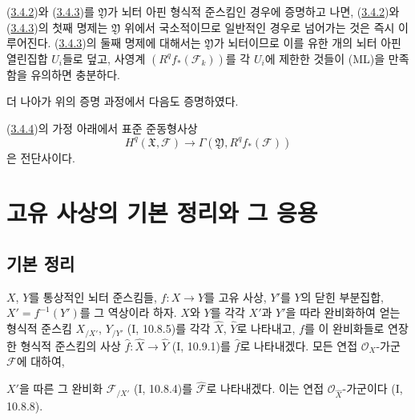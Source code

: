 \begin{env}[3.4.5]
(\hyperref[III.3.4.2-fr]{3.4.2})와
(\hyperref[III.3.4.3-fr]{3.4.3})를 $\mathfrak Y$가 뇌터 아핀
형식적 준스킴인 경우에 증명하고 나면,
(\hyperref[III.3.4.2-fr]{3.4.2})와
(\hyperref[III.3.4.3-fr]{3.4.3})의 첫째 명제는 $\mathfrak Y$ 위에서
국소적이므로 일반적인 경우로 넘어가는 것은 즉시 이루어진다.
(\hyperref[III.3.4.3-fr]{3.4.3})의 둘째 명제에 대해서는
$\mathfrak Y$가 뇌터이므로 이를 유한 개의 뇌터 아핀 열린집합
$U_i$들로 덮고, 사영계 $(R^qf_*(\mathcal F_k))$를 각 $U_i$에 제한한
것들이 (ML)을 만족함을 유의하면 충분하다.
\end{env}

더 나아가 위의 증명 과정에서 다음도 증명하였다.

\begin{corollary}[3.4.6]
\label{III.3.4.6-fr}
(\hyperref[III.3.4.4-fr]{3.4.4})의 가정 아래에서 표준 준동형사상
\[
H^q(\mathfrak X,\mathcal F)
\longrightarrow\Gamma(\mathfrak Y,R^qf_*(\mathcal F))
\tag{3.4.6.1}\label{III.3.4.6.1-fr}
\]
은 전단사이다.
\end{corollary}

\section{고유 사상의 기본 정리와 그 응용}
\label{section:III.4-fr}

\subsection{기본 정리}
\label{subsection:III.4.1-fr}

\begin{env}[4.1.1]
\label{III.4.1.1-fr}
$X$, $Y$를 통상적인 뇌터 준스킴들, $f:X\to Y$를 고유 사상,
$Y'$를 $Y$의 닫힌 부분집합, $X'=f^{-1}(Y')$를 그 역상이라 하자.
$X$와 $Y$를 각각 $X'$과 $Y'$을 따라 완비화하여 얻는 형식적 준스킴
$X_{/X'}$, $Y_{/Y'}$ (I, 10.8.5)를 각각 $\widehat X$,
$\widehat Y$로 나타내고, $f$를 이 완비화들로 연장한 형식적 준스킴의
사상 $\widehat f:\widehat X\to\widehat Y$ (I, 10.9.1)를
$\widehat f$로 나타내겠다. 모든 연접 $\mathcal O_X$-가군
$\mathcal F$에 대하여,


$X'$을 따른 그 완비화 $\mathcal F_{/X'}$ (I, 10.8.4)를
$\widehat{\mathcal F}$로 나타내겠다. 이는 연접
$\mathcal O_{\widehat X}$-가군이다 (I, 10.8.8).
\end{env}

